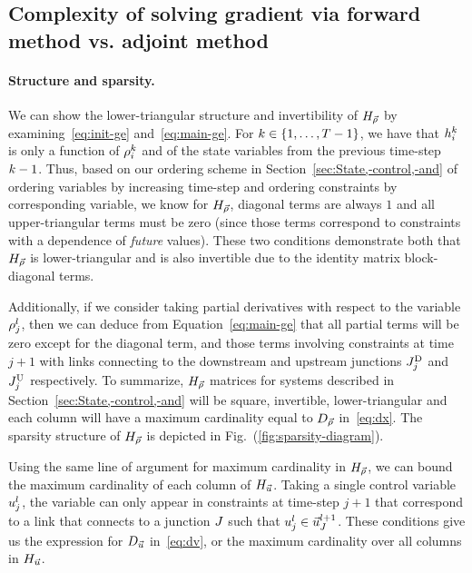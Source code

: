 								
				\subsection{Complexity of solving gradient via forward method vs. adjoint method\label{sub:Complexity-of-solving}}
								
								
				\paragraph{Structure and sparsity.\label{par:Structure-and-sparsity}}
								
				We can show the lower-triangular structure and invertibility of $H_{\vec{\rho}}$
				by examining~\eqref{eq:init-ge} and~\eqref{eq:main-ge}. For $\tind\in\intrange 1{\ntime-1}$,
				we have that $h_{i}^{k}$ is only a function of $\rho_{i}^{k}$
				and of the state variables from the previous time-step $k-1$.
				Thus, based on our ordering scheme in Section~\ref{sec:State,-control,-and}
				of ordering variables by increasing time-step and ordering constraints
				by corresponding variable, we know for $H_{\vec{\rho}}$, diagonal terms are
				always $1$ and all upper-triangular terms must be zero (since those
				terms correspond to constraints with a dependence of \emph{future}
				values). These two conditions demonstrate both that $H_{\vec{\rho}}$ is lower-triangular
				and is also invertible due to the identity matrix block-diagonal terms.
								
				Additionally, if we consider taking partial derivatives with respect
				to the variable $\rho_{j}^{l}$, then we can deduce from Equation~\eqref{eq:main-ge}
				that all partial terms will be zero except for the diagonal term,
				and those terms involving constraints at time $j+1$ with links connecting
				to the downstream and upstream junctions $J_{j}^{\text{D}}$ and $J_{j}^{\text{U}}$
				respectively. To summarize, $H_{\vec{\rho}}$ matrices for systems described
				in Section~\ref{sec:State,-control,-and} will be square, invertible,
				lower-triangular and each column will have a maximum cardinality equal
				to $D_{\vec{\rho}}$ in~\eqref{eq:dx}. The sparsity structure of
				$H_{\vec{\rho}}$ is depicted in Fig.~(\ref{fig:sparsity-diagram}).
								
				Using the same line of argument for maximum cardinality in $H_{\vec{\rho}}$,
				we can bound the maximum cardinality of each column of $H_{\vec{u}}$. Taking
				a single control variable $u_{j}^{l}$, the variable can only
				appear in constraints at time-step $j+1$ that correspond to a link
				that connects to a junction $J$ such that $u_{j}^{l}\in\vec{u}_{J}^{l+1}$.
				These conditions give us the expression for $D_{\vec{u}}$ in~\eqref{eq:dv},
				or the maximum cardinality over all columns in $H_{\vec{u}}$.
								

